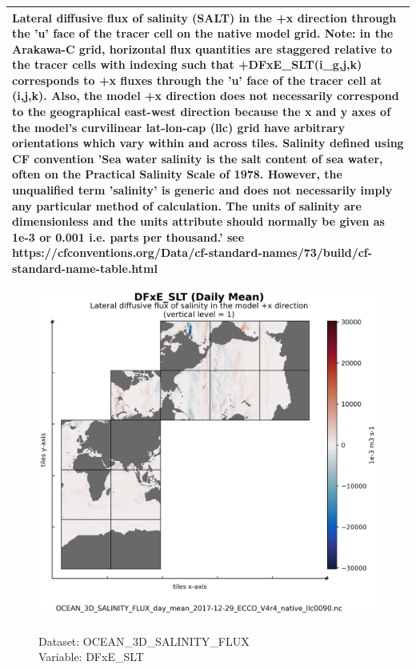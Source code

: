 \begin{longtable}{|p{}|p{}|p{}|p{}|}
\multicolumn{4}{|p{1\textwidth}|}{Lateral diffusive flux of salinity (SALT) in the +x direction through the 'u' face of the tracer cell on the native model grid. Note: in the Arakawa-C grid, horizontal flux quantities are staggered relative to the tracer cells with indexing such that +DFxE\_SLT(i\_g,j,k) corresponds to +x fluxes through the 'u' face of the tracer cell at (i,j,k). Also, the model +x direction does not necessarily correspond to the geographical east-west direction because the x and y axes of the model's curvilinear lat-lon-cap (llc) grid have arbitrary orientations which vary within and across tiles. Salinity defined using CF convention 'Sea water salinity is the salt content of sea water, often on the Practical Salinity Scale of 1978. However, the unqualified term 'salinity' is generic and does not necessarily imply any particular method of calculation. The units of salinity are dimensionless and the units attribute should normally be given as 1e-3 or 0.001 i.e. parts per thousand.' see https://cfconventions.org/Data/cf-standard-names/73/build/cf-standard-name-table.html} \\ \hline
\end{longtable}

\begin{figure}[H]
\centering
\includegraphics[scale=0.5]{../images/plots/native_plots/Ocean_Three-Dimensional_Salinity_Fluxes/DFxE_SLT.png}
\caption{\\Dataset: OCEAN\_3D\_SALINITY\_FLUX\\Variable: DFxE\_SLT}
\label{tab:table-OCEAN_3D_SALINITY_FLUX_DFxE_SLT-Plot}
\end{figure}
\pagebreak
